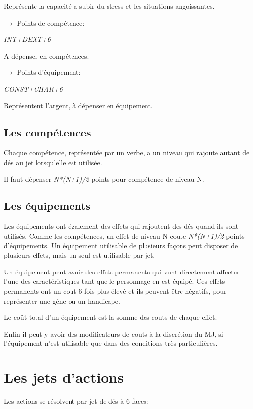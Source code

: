\begin{landscape}
\begin{multicols}{4}
Représente la capacité a subir du stress et les situations angoissantes.



$\rightarrow$ Points de compétence:

\textit{INT+DEXT+6}

A dépenser en compétences.


$\rightarrow$ Points d'équipement:	

\textit{CONST+CHAR+6}

Représentent l'argent, à dépenser en équipement. 
	

\subsection{Les compétences}

Chaque compétence, représentée par un verbe, a un niveau qui rajoute autant de dés au jet lorsqu'elle est utilisée.
	
Il faut dépenser \textit{N*(N+1)/2} points pour compétence de niveau N.


\subsection{Les équipements}

Les équipements ont également des effets qui rajoutent des dés quand ils sont utilisés. 
Comme les compétences, un effet de niveau N coute \textit{N*(N+1)/2} points d'équipements.
Un équipement utilisable de plusieurs façons peut disposer de plusieurs effets, mais un seul est utilisable par jet. 

Un équipement peut avoir des effets permanents qui vont directement affecter l'une des caractéristiques tant que le personnage en est équipé.
Ces effets permanents ont un cout 6 fois plus élevé et ils peuvent être négatifs, pour représenter une gêne ou un handicape.

Le coût total d'un équipement est la somme des couts de chaque effet.

Enfin il peut y avoir des modificateurs de couts à la discrétion du MJ, si l'équipement n'est utilisable que dans des conditions très particulières.


\section{Les jets d'actions}
	
Les actions se résolvent par jet de dés à 6 faces: 


\end{multicols}
\end{landscape}

